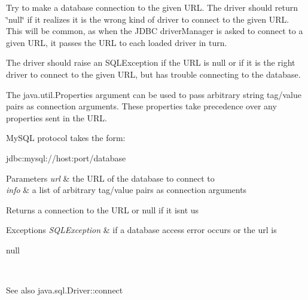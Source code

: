 Try to make a database connection to the given U\+RL. The driver should return \char`\"{}null\char`\"{} if it realizes it is the wrong kind of driver to connect to the given U\+RL. This will be common, as when the J\+D\+BC driver\+Manager is asked to connect to a given U\+RL, it passes the U\+RL to each loaded driver in turn.

The driver should raise an S\+Q\+L\+Exception if the U\+RL is null or if it is the right driver to connect to the given U\+RL, but has trouble connecting to the database. 

The java.\+util.\+Properties argument can be used to pass arbitrary string tag/value pairs as connection arguments. These properties take precedence over any properties sent in the U\+RL. 

My\+S\+QL protocol takes the form\+:


\begin{DoxyPre}
jdbc:mysql://host:port/database
\end{DoxyPre}



\begin{DoxyParams}{Parameters}
{\em url} & the U\+RL of the database to connect to \\
\hline
{\em info} & a list of arbitrary tag/value pairs as connection arguments\\
\hline
\end{DoxyParams}
\begin{DoxyReturn}{Returns}
a connection to the U\+RL or null if it isn\textquotesingle{}t us
\end{DoxyReturn}

\begin{DoxyExceptions}{Exceptions}
{\em S\+Q\+L\+Exception} & if a database access error occurs or the url is
\begin{DoxyCode}
null 
\end{DoxyCode}
\\
\hline
\end{DoxyExceptions}
\begin{DoxySeeAlso}{See also}
java.\+sql.\+Driver\+::connect 
\end{DoxySeeAlso}
\mbox{\label{classcom_1_1mysql_1_1cj_1_1jdbc_1_1_non_registering_driver_a49801fef4e0494c6b788eab02ed7c30f}} 
